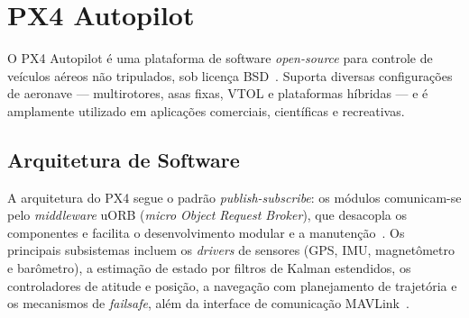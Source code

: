 \section{PX4 Autopilot}

O PX4 Autopilot é uma plataforma de software \textit{open-source} para controle de
veículos aéreos não tripulados, sob licença BSD~\cite{PX4_GitHub,
PX4_Documentation}. Suporta diversas configurações de aeronave --- multirotores,
asas fixas, VTOL e plataformas híbridas --- e é amplamente utilizado em aplicações
comerciais, científicas e recreativas.

\subsection{Arquitetura de Software}

A arquitetura do PX4 segue o padrão \textit{publish-subscribe}: os módulos
comunicam-se pelo \textit{middleware} uORB (\textit{micro Object Request Broker}),
que desacopla os componentes e facilita o desenvolvimento modular e a
manutenção~\cite{PX4_Documentation}. Os principais subsistemas incluem os
\textit{drivers} de sensores (GPS, IMU, magnetômetro e barômetro), a estimação de
estado por filtros de Kalman estendidos, os controladores de atitude e posição, a
navegação com planejamento de trajetória e os mecanismos de \textit{failsafe},
além da interface de comunicação MAVLink~\cite{PX4_Documentation}.

